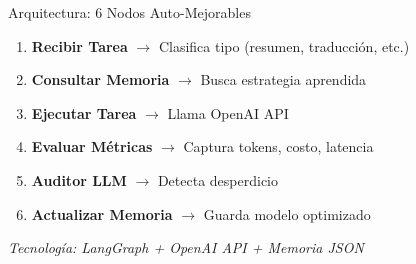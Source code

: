 \documentclass[aspectratio=169,14pt]{beamer}
\begin{document}
\begin{frame}{Arquitectura: 6 Nodos Auto-Mejorables}

\begin{enumerate}
    \item \textbf{Recibir Tarea} $\rightarrow$ Clasifica tipo (resumen, traducción, etc.)
    
    \vspace{0.3cm}
    
    \item \textbf{Consultar Memoria} $\rightarrow$ Busca estrategia aprendida
    
    \vspace{0.3cm}
    
    \item \textbf{Ejecutar Tarea} $\rightarrow$ Llama OpenAI API
    
    \vspace{0.3cm}
    
    \item \textbf{Evaluar Métricas} $\rightarrow$ Captura tokens, costo, latencia
    
    \vspace{0.3cm}
    
    \item \textbf{Auditor LLM} $\rightarrow$ Detecta desperdicio
    
    \vspace{0.3cm}
    
    \item \textbf{Actualizar Memoria} $\rightarrow$ Guarda modelo optimizado
\end{enumerate}

\vspace{0.3cm}

\begin{center}
\textit{Tecnología: LangGraph + OpenAI API + Memoria JSON}
\end{center}

\end{frame}
\end{document}
